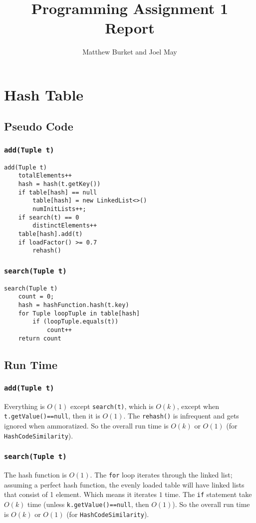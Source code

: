 \documentclass[10pt,letterpaper]{article}
\author{Matthew Burket and Joel May}
\title{Programming Assignment 1 Report}
\begin{document}
\maketitle
\section{Hash Table}
\subsection{Pseudo Code} 
\subsubsection{\texttt{add(Tuple t)}}
\begin{verbatim}
add(Tuple t)
    totalElements++
    hash = hash(t.getKey())
    if table[hash] == null
        table[hash] = new LinkedList<>()
        numInitLists++;
    if search(t) == 0
        distinctElements++
    table[hash].add(t)
    if loadFactor() >= 0.7
        rehash()
\end{verbatim}
\subsubsection{\texttt{search(Tuple t)}}
\begin{verbatim}
search(Tuple t) 
    count = 0;
    hash = hashFunction.hash(t.key)
    for Tuple loopTuple in table[hash]
        if (loopTuple.equals(t))
            count++
    return count
\end{verbatim}
\subsection{Run Time}
\subsubsection{\texttt{add(Tuple t)}}
Everything is $O(1)$ except \texttt{search(t)}, which is $O(k)$, except when \texttt{t.getValue()==null}, then it is $O(1)$. The \texttt{rehash()} is infrequent and gets ignored when ammoratized. So the overall run time is $O(k)$ or $O(1)$ (for \texttt{HashCodeSimilarity}).
\subsubsection{\texttt{search(Tuple t)}}
The hash function is $O(1)$. The \texttt{for} loop iterates through the linked list; assuming a perfect hash function, the evenly loaded table will have linked lists that consist of 1 element. Which means it iterates $1$ time. The \texttt{if} statement take $O(k)$ time (unless \texttt{k.getValue()==null}, then $O(1)$). So the overall run time is $O(k)$ or $O(1)$ (for \texttt{HashCodeSimilarity}).
\end{document}
